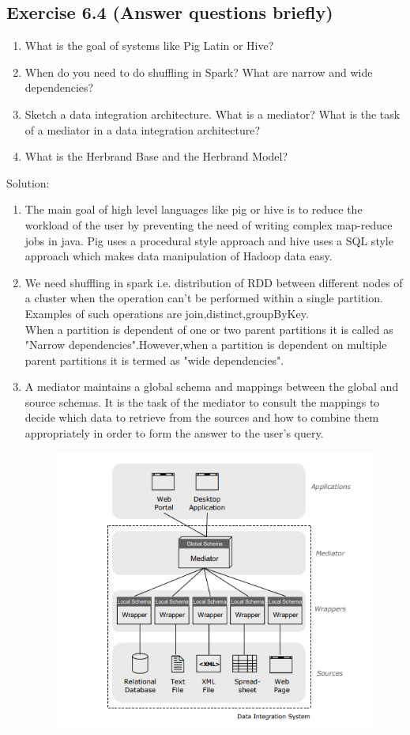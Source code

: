 \documentclass[10pt]{article}
\begin{document}
	\subsection*{Exercise 6.4 (Answer questions briefly)}
	\begin{enumerate}
	    \item What is the goal of systems like Pig Latin or Hive?
	    \item When do you need to do shuffling in Spark? What are narrow and wide dependencies?
	    \item Sketch a data integration architecture. What is a mediator? What is the task of a mediator in a data integration 			architecture?
	    \item What is the Herbrand Base and the Herbrand Model?
	\end{enumerate}
	Solution:
	\begin{enumerate}
	    \item The main goal of high level languages like pig or hive is to reduce the workload of the user by preventing the need of 			writing complex map-reduce jobs in java. Pig uses a procedural style approach and hive uses a SQL style approach 			which makes data manipulation of Hadoop data easy.
	    \item We need shuffling in spark i.e. distribution of RDD between different nodes of a cluster when the operation can't be 			performed within a single partition. Examples of such operations are join,distinct,groupByKey.
	    \\When a partition is dependent of one or two parent partitions it is called as "Narrow dependencies".However,when a 			partition is dependent on multiple parent partitions it is termed as "wide dependencies".
	    \item
	     A mediator maintains a global schema and mappings between the global and source schemas. It is the task of the mediator to consult the mappings to decide which data to retrieve from the sources and how to combine them appropriately in order to form the answer to the user’s query.
	     \bigskip
	     \begin{figure}[H]
	     	\centering
	     	\includegraphics[scale=0.40]{Data_integration.png}

\end{figure}
\end{enumerate}
\end{document}
